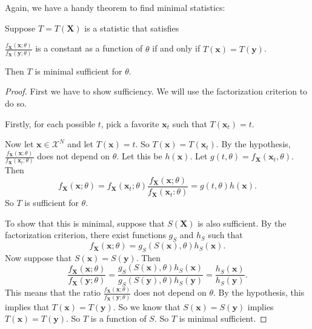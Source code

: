 \documentclass[a4paper]{article}
\begin{document}
Again, we have a handy theorem to find minimal statistics:
\begin{thm}
  Suppose $T = T(\mathbf{X})$ is a statistic that satisfies
  \begin{center}
    $\displaystyle\frac{f_\mathbf{X}(\mathbf{x}; \theta)}{f_\mathbf{X}(\mathbf{y}; \theta)}$ is a constant as a function of $\theta$ if and only if $T(\mathbf{x}) = T(\mathbf{y})$.
  \end{center}
  Then $T$ is minimal sufficient for $\theta$.
\end{thm}
\begin{proof}
  First we have to show sufficiency. We will use the factorization criterion to do so.

  Firstly, for each possible $t$, pick a favorite $\mathbf{x}_t$ such that $T(\mathbf{x}_t) = t$.

  Now let $\mathbf{x}\in \mathcal{X}^N$ and let $T(\mathbf{x}) = t$. So $T(\mathbf{x}) = T(\mathbf{x}_t)$. By the hypothesis, $\frac{f_\mathbf{X}(\mathbf{x}; \theta)}{f_\mathbf{X}(\mathbf{x}_t: \theta)}$ does not depend on $\theta$. Let this be $h(\mathbf{x})$. Let $g(t, \theta) = f_\mathbf{X}(\mathbf{x}_t, \theta)$. Then
  \[
    f_\mathbf{X}(\mathbf{x}; \theta) = f_\mathbf{X}(\mathbf{x}_t; \theta) \frac{f_\mathbf{X}(\mathbf{x}; \theta)}{f_\mathbf{X}(\mathbf{x}_t: \theta)} = g(t, \theta) h(\mathbf{x}).
  \]
  So $T$ is sufficient for $\theta$.

  To show that this is minimal, suppose that $S(\mathbf{X})$ is also sufficient. By the factorization criterion, there exist functions $g_S$ and $h_S$ such that
  \[
    f_\mathbf{X}(\mathbf{x}; \theta) = g_S(S(\mathbf{x}), \theta) h_S(\mathbf{x}).
  \]
  Now suppose that $S(\mathbf{x}) = S(\mathbf{y})$. Then
  \[
    \frac{f_\mathbf{X}(\mathbf{x}; \theta)}{f_\mathbf{X}(\mathbf{y}; \theta)} = \frac{g_S(S(\mathbf{x}), \theta)h_S(\mathbf{x})}{g_S(S(\mathbf{y}), \theta)h_S(\mathbf{y})} = \frac{h_S(\mathbf{x})}{h_S(\mathbf{y})}.
  \]
  This means that the ratio $\frac{f_\mathbf{X}(\mathbf{x}; \theta)}{f_\mathbf{X}(\mathbf{y}; \theta)}$ does not depend on $\theta$. By the hypothesis, this implies that $T(\mathbf{x}) = T(\mathbf{y})$. So we know that $S(\mathbf{x}) = S(\mathbf{y})$ implies $T(\mathbf{x}) = T(\mathbf{y})$. So $T$ is a function of $S$. So $T$ is minimal sufficient.
\end{proof}
\end{document}
